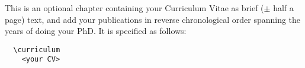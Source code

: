 \curriculum
This is an optional chapter containing your Curriculum Vitae as brief ($\pm$ half a page) text, and add your publications in reverse chronological order spanning the years of doing your PhD.
It is specified as follows:
\begin{verbatim}
  \curriculum
    <your CV>
\end{verbatim}

